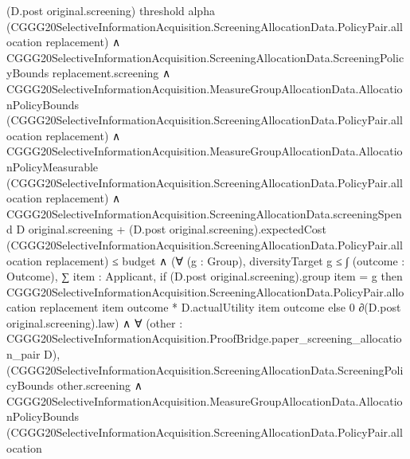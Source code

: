 \documentclass[10pt]{article}
\begin{document}
\begin{ReviewVerbatim}
                      (D.post original.screening) threshold alpha
                      (CGGG20SelectiveInformationAcquisition.ScreeningAllocationData.PolicyPair.allocation
                        replacement) ∧
                    CGGG20SelectiveInformationAcquisition.ScreeningAllocationData.ScreeningPolicyBounds
                        replacement.screening ∧
                      CGGG20SelectiveInformationAcquisition.MeasureGroupAllocationData.AllocationPolicyBounds
                          (CGGG20SelectiveInformationAcquisition.ScreeningAllocationData.PolicyPair.allocation
                            replacement) ∧
                        CGGG20SelectiveInformationAcquisition.MeasureGroupAllocationData.AllocationPolicyMeasurable
                            (CGGG20SelectiveInformationAcquisition.ScreeningAllocationData.PolicyPair.allocation
                              replacement) ∧
                          CGGG20SelectiveInformationAcquisition.ScreeningAllocationData.screeningSpend D
                                  original.screening +
                                (D.post original.screening).expectedCost
                                  (CGGG20SelectiveInformationAcquisition.ScreeningAllocationData.PolicyPair.allocation
                                    replacement) ≤
                              budget ∧
                            (∀ (g : Group),
                                diversityTarget g ≤
                                  ∫ (outcome : Outcome),
                                    ∑ item : Applicant,
                                      if (D.post original.screening).group item = g then
                                        CGGG20SelectiveInformationAcquisition.ScreeningAllocationData.PolicyPair.allocation
                                            replacement item outcome *
                                          D.actualUtility item outcome
                                      else 0 ∂(D.post original.screening).law) ∧
                              ∀
                                (other :
                                  CGGG20SelectiveInformationAcquisition.ProofBridge.paper_screening_allocation_pair D),
                                (CGGG20SelectiveInformationAcquisition.ScreeningAllocationData.ScreeningPolicyBounds
                                      other.screening ∧
                                    CGGG20SelectiveInformationAcquisition.MeasureGroupAllocationData.AllocationPolicyBounds
                                        (CGGG20SelectiveInformationAcquisition.ScreeningAllocationData.PolicyPair.allocation

\end{ReviewVerbatim}
\end{document}
